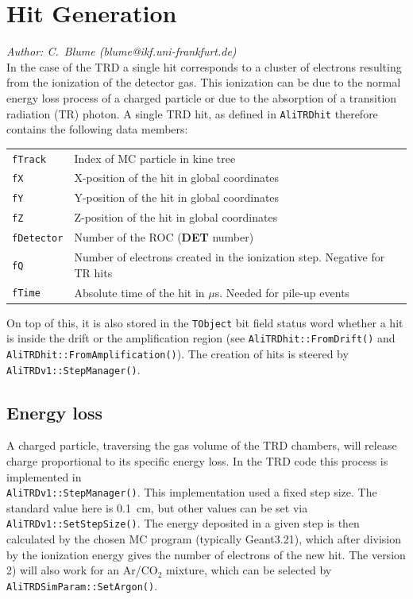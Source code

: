 \documentclass{alicetdr}
\begin{document}
\section{Hit Generation}
%
{\it Author: C.~Blume (blume@ikf.uni-frankfurt.de)}
\smallskip
\\
%
In the case of the TRD a single hit corresponds to a cluster of electrons
resulting from the ionization of the detector gas.  This ionization can be due
to the normal energy loss process of a charged particle or due to the
absorption of a transition radiation (TR) photon.  A single TRD hit, as
defined in {\tt AliTRDhit} therefore contains the following data members:
%
\begin{center}
\begin{tabular}{ll}
{\tt fTrack}    & Index of MC particle in kine tree                                        \\
{\tt fX}        & X-position of the hit in global coordinates                              \\
{\tt fY}        & Y-position of the hit in global coordinates                              \\
{\tt fZ}        & Z-position of the hit in global coordinates                              \\
{\tt fDetector} & Number of the ROC ({\bf DET} number)                                     \\
{\tt fQ}        & Number of electrons created in the ionization step. Negative for TR hits \\
{\tt fTime}     & Absolute time of the hit in $\mu$s. Needed for pile-up events            \\
\end{tabular}
\end{center}
%
On top of this, it is also stored in the {\tt TObject} bit field status word
whether a hit is inside the drift or the amplification region
(see {\tt AliTRDhit::FromDrift()} and {\tt AliTRDhit::FromAmplification()}).
The creation of hits is steered by {\tt AliTRDv1::StepManager()}.
%
\subsection{Energy loss}
%
A charged particle, traversing the gas volume of the TRD chambers, will release
charge proportional to its specific energy loss.  In the TRD code this process
is implemented in \\{\tt AliTRDv1::StepManager()}.  This implementation used a
fixed step size.  The standard value here is 0.1~cm, but other values can be
set via {\tt AliTRDv1::SetStepSize()}.  The energy deposited in a given step is
then calculated by the chosen MC program (typically Geant3.21), which after
division by the ionization energy gives the number of electrons of the new hit.
The version 2) will also work for an Ar/CO$_{2}$ mixture, which can be selected
by \\{\tt AliTRDSimParam::SetArgon()}.
%
\end{document}
